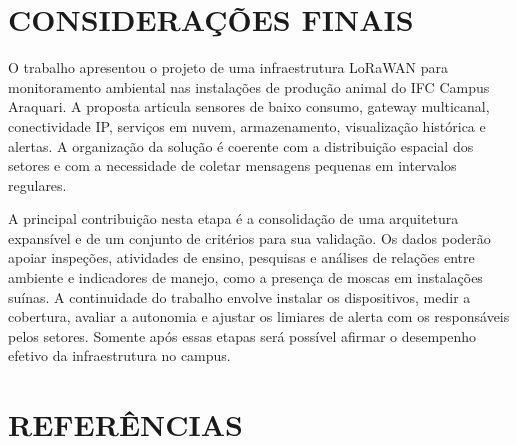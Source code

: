 \documentclass[12pt,a4paper]{article}
\begin{document}
\section{CONSIDERAÇÕES FINAIS}

O trabalho apresentou o projeto de uma infraestrutura LoRaWAN para monitoramento ambiental nas instalações de produção animal do IFC Campus Araquari. A proposta articula sensores de baixo consumo, gateway multicanal, conectividade IP, serviços em nuvem, armazenamento, visualização histórica e alertas. A organização da solução é coerente com a distribuição espacial dos setores e com a necessidade de coletar mensagens pequenas em intervalos regulares.

A principal contribuição nesta etapa é a consolidação de uma arquitetura expansível e de um conjunto de critérios para sua validação. Os dados poderão apoiar inspeções, atividades de ensino, pesquisas e análises de relações entre ambiente e indicadores de manejo, como a presença de moscas em instalações suínas. A continuidade do trabalho envolve instalar os dispositivos, medir a cobertura, avaliar a autonomia e ajustar os limiares de alerta com os responsáveis pelos setores. Somente após essas etapas será possível afirmar o desempenho efetivo da infraestrutura no campus.

\section{REFERÊNCIAS}
\begingroup
\renewcommand{\section}[2]{}


\endgroup
\end{document}
